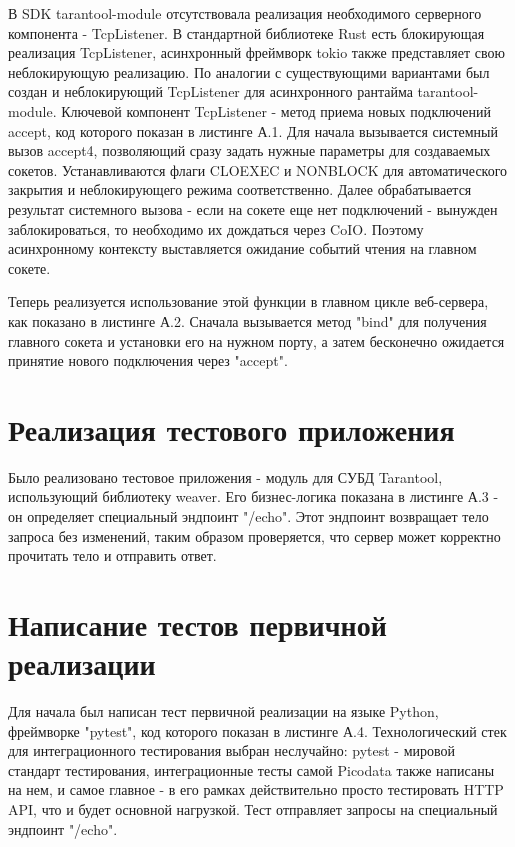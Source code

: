 \documentclass[times,numbers=noenddot]{itmo-student-thesis}
\begin{document}
В SDK tarantool-module отсутствовала реализация необходимого серверного компонента - TcpListener.
В стандартной библиотеке Rust есть блокирующая реализация TcpListener, асинхронный фреймворк tokio также представляет свою неблокирующую реализацию.
По аналогии с существующими вариантами был создан и неблокирующий TcpListener для асинхронного рантайма tarantool-module.
Ключевой компонент TcpListener - метод приема новых подключений accept, код которого показан в листинге А.1.
Для начала вызывается системный вызов accept4, позволяющий сразу задать нужные параметры для создаваемых сокетов.
Устанавливаются флаги CLOEXEC и NONBLOCK для автоматического закрытия и неблокирующего режима соответственно.
Далее обрабатывается результат системного вызова - если на сокете еще нет подключений - вынужден заблокироваться, то необходимо их дождаться через CoIO.
Поэтому асинхронному контексту выставляется ожидание событий чтения на главном сокете.

Теперь реализуется использование этой функции в главном цикле веб-сервера, как показано в листинге А.2.
Сначала вызывается метод "bind" для получения главного сокета и установки его на нужном порту, а затем бесконечно ожидается принятие нового подключения через "accept".

\section{Реализация тестового приложения}\label{sec:impl_test_app}

Было реализовано тестовое приложения - модуль для СУБД Tarantool, использующий библиотеку weaver.
Его бизнес-логика показана в листинге А.3 - он определяет специальный эндпоинт "/echo".
Этот эндпоинт возвращает тело запроса без изменений, таким образом проверяется, что сервер может корректно прочитать тело и отправить ответ.

\section{Написание тестов первичной реализации}\label{sec:impl_tests}

Для начала был написан тест первичной реализации на языке Python, фреймворке "pytest", код которого показан в листинге А.4.
Технологический стек для интеграционного тестирования выбран неслучайно: pytest - мировой стандарт тестирования, интеграционные тесты самой Picodata также написаны на нем, и самое главное - в его рамках действительно просто тестировать HTTP API, что и будет основной нагрузкой.
Тест отправляет запросы на специальный эндпоинт "/echo".
\end{document}
